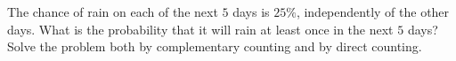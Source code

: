 The chance of rain on each of the next $5$ days is $25\%$, independently of the other days. What is the probability that it will rain at least once in the next $5$ days? Solve the problem both by complementary counting and by direct counting.
